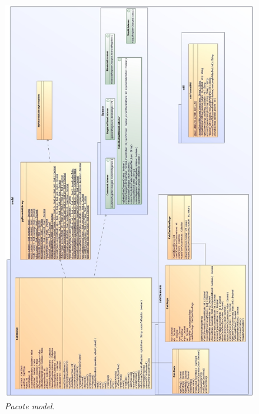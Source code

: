 \begin{figure}[!h]
\centering 
\includegraphics[scale=0.38]{model.eps}
 \caption{\it Pacote model.} \label{model}
\end{figure}
